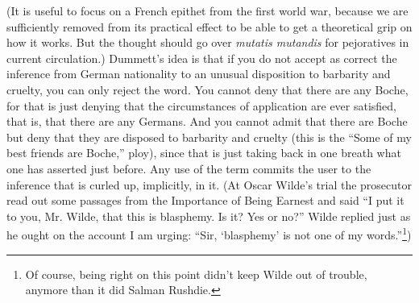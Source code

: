 (It is useful to focus on a French epithet from the first world war,
because we are sufficiently removed from its practical effect to be able
to get a theoretical grip on how it works. But the thought should go
over \emph{mutatis mutandis} for pejoratives in current circulation.)
Dummett's idea is that if you do not accept as correct the inference
from German nationality to an unusual disposition to barbarity and
cruelty, you can only reject the word. You cannot deny that there are
any Boche, for that is just denying that the circumstances of
application are ever satisfied, that is, that there are any Germans. And
you cannot admit that there are Boche but deny that they are disposed to
barbarity and cruelty (this is the ``Some of my best friends are
Boche,'' ploy), since that is just taking back in one breath what one
has asserted just before. Any use of the term commits the user to the
inference that is curled up, implicitly, in it. (At Oscar Wilde's trial
the prosecutor read out some passages from the Importance of Being
Earnest and said ``I put it to you, Mr. Wilde, that this is blasphemy.
Is it? Yes or no?'' Wilde replied just as he ought on the account I am
urging: ``Sir, `blasphemy' is not one of my words.''\footnote{Of course,
  being right on this point didn't keep Wilde out of trouble, anymore
  than it did Salman Rushdie.})

